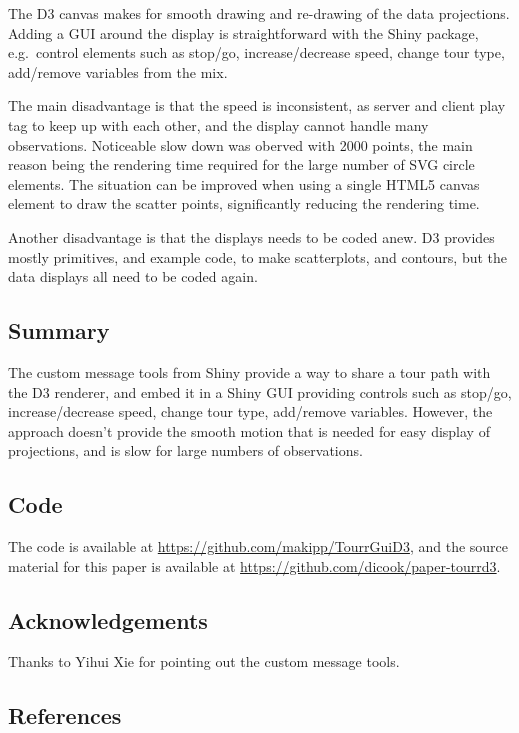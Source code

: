 The D3 canvas makes for smooth drawing and re-drawing of the data
projections. Adding a GUI around the display is straightforward with the
Shiny package, e.g.~control elements such as stop/go, increase/decrease
speed, change tour type, add/remove variables from the mix.

The main disadvantage is that the speed is inconsistent, as server and
client play tag to keep up with each other, and the display cannot
handle many observations. Noticeable slow down was oberved with 2000
points, the main reason being the rendering time required for the large
number of SVG circle elements. The situation can be improved when using
a single HTML5 canvas element to draw the scatter points, significantly
reducing the rendering time.

Another disadvantage is that the displays needs to be coded anew. D3
provides mostly primitives, and example code, to make scatterplots, and
contours, but the data displays all need to be coded again.

\subsection{Summary}\label{summary}

The custom message tools from Shiny provide a way to share a tour path
with the D3 renderer, and embed it in a Shiny GUI providing controls
such as stop/go, increase/decrease speed, change tour type, add/remove
variables. However, the approach doesn't provide the smooth motion that
is needed for easy display of projections, and is slow for large numbers
of observations.

\subsection{Code}\label{code}

The code is available at \url{https://github.com/makipp/TourrGuiD3}, and
the source material for this paper is available at
\url{https://github.com/dicook/paper-tourrd3}.

\subsection{Acknowledgements}\label{acknowledgements}

Thanks to Yihui Xie for pointing out the custom message tools.

\subsection{References}\label{references}

